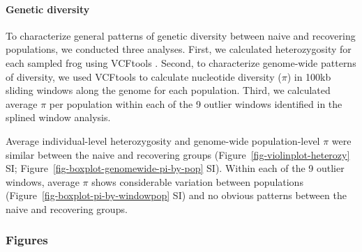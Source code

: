\documentclass[
  letterpaper,
  DIV=11,
  numbers=noendperiod]{scrartcl}
\let\oldparagraph\paragraph
\renewcommand{\paragraph}[1]{\oldparagraph{#1}\mbox{}}
\begin{document}
\hypertarget{genetic-diversity}{%
\paragraph{Genetic diversity}\label{genetic-diversity}}

To characterize general patterns of genetic diversity between naive and
recovering populations, we conducted three analyses. First, we
calculated heterozygosity for each sampled frog using VCFtools
\citep{danecek2011}. Second, to characterize genome-wide patterns of
diversity, we used VCFtools to calculate nucleotide diversity (\(\pi\))
in 100kb sliding windows along the genome for each population. Third, we
calculated average \(\pi\) per population within each of the 9 outlier
windows identified in the splined window analysis.

Average individual-level heterozygosity and genome-wide population-level
\(\pi\) were similar between the naive and recovering groups
(Figure~\ref{fig-violinplot-heterozy} SI;
Figure~\ref{fig-boxplot-genomewide-pi-by-pop} SI). Within each of the 9
outlier windows, average \(\pi\) shows considerable variation between
populations (Figure~\ref{fig-boxplot-pi-by-windowpop} SI) and no obvious
patterns between the naive and recovering groups.

\newpage

\hypertarget{figures-1}{%
\subsubsection{Figures}\label{figures-1}}

\newpage
\end{document}
